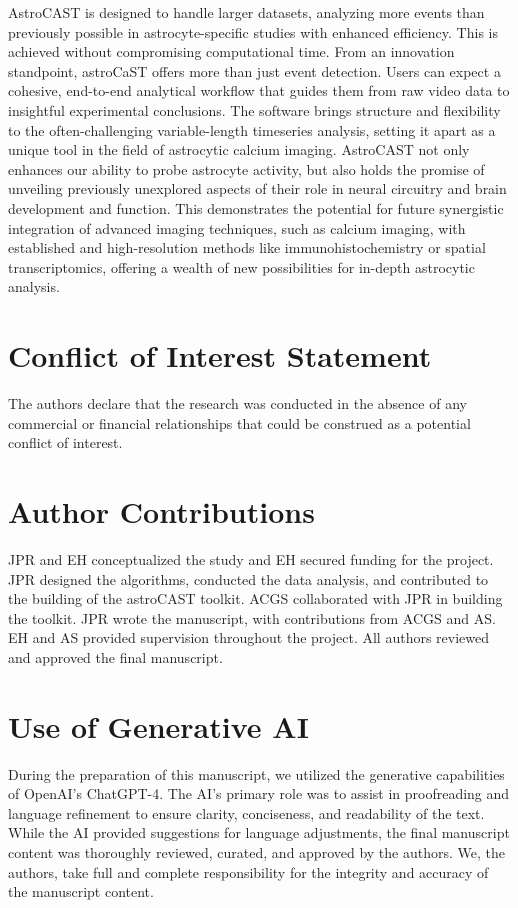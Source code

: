 \documentclass[utf8]{FrontiersinHarvard}
\begin{document}
    AstroCAST is designed to handle larger datasets, analyzing more events than previously possible in astrocyte-specific studies with enhanced efficiency. This is achieved without compromising computational time. From an innovation standpoint, astroCaST offers more than just event detection. Users can expect a cohesive, end-to-end analytical workflow that guides them from raw video data to insightful experimental conclusions. The software brings structure and flexibility to the often-challenging variable-length timeseries analysis, setting it apart as a unique tool in the field of astrocytic calcium imaging. AstroCAST not only enhances our ability to probe astrocyte activity, but also holds the promise of unveiling previously unexplored aspects of their role in neural circuitry and brain development and function. This demonstrates the potential for future synergistic integration of advanced imaging techniques, such as calcium imaging, with established and high-resolution methods like immunohistochemistry or spatial transcriptomics, offering a wealth of new possibilities for in-depth astrocytic analysis.


    \section*{Conflict of Interest Statement}
    The authors declare that the research was conducted in the absence of any commercial or financial relationships that could be construed as a potential conflict of interest.

    \section*{Author Contributions}
    JPR and EH conceptualized the study and EH secured funding for the project. JPR designed the algorithms, conducted the data analysis, and contributed to the building of the astroCAST toolkit. ACGS collaborated with JPR in building the toolkit. JPR wrote the manuscript, with contributions from ACGS and AS. EH and AS provided supervision throughout the project. All authors reviewed and approved the final manuscript.

    \section*{Use of Generative AI}
    During the preparation of this manuscript, we utilized the generative capabilities of OpenAI's ChatGPT-4. The AI's primary role was to assist in proofreading and language refinement to ensure clarity, conciseness, and readability of the text. While the AI provided suggestions for language adjustments, the final manuscript content was thoroughly reviewed, curated, and approved by the authors. We, the authors, take full and complete responsibility for the integrity and accuracy of the manuscript content.
\end{document}
